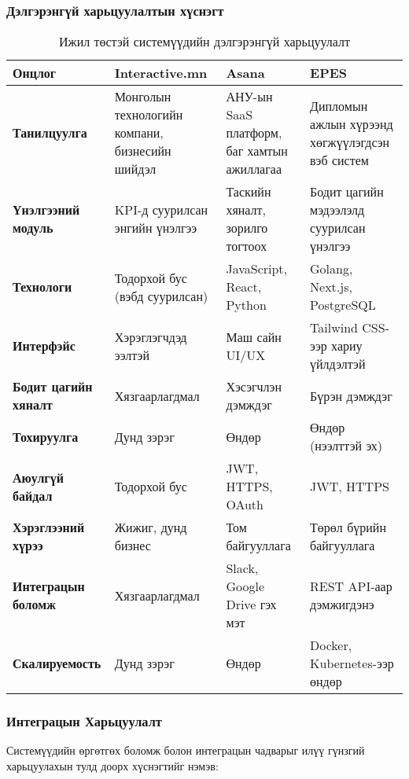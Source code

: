 \subsubsection{Дэлгэрэнгүй харьцуулалтын хүснэгт}
\begin{table}[h]
\centering
\small
\begin{tabular}{|>{\raggedright\arraybackslash}p{3cm}|>{\raggedright\arraybackslash}p{4cm}|>{\raggedright\arraybackslash}p{4cm}|>{\raggedright\arraybackslash}p{4cm}|}
\hline
\textbf{Онцлог} & \textbf{Interactive.mn} & \textbf{Asana} & \textbf{EPES} \\
\hline
\textbf{Танилцуулга} & Монголын технологийн компани, бизнесийн шийдэл & АНУ-ын SaaS платформ, баг хамтын ажиллагаа & Дипломын ажлын хүрээнд хөгжүүлэгдсэн вэб систем \\
\hline
\textbf{Үнэлгээний модуль} & KPI-д суурилсан энгийн үнэлгээ & Таскийн хяналт, зорилго тогтоох & Бодит цагийн мэдээлэлд суурилсан үнэлгээ \\
\hline
\textbf{Технологи} & Тодорхой бус (вэбд суурилсан) & JavaScript, React, Python & Golang, Next.js, PostgreSQL \\
\hline
\textbf{Интерфэйс} & Хэрэглэгчдэд ээлтэй & Маш сайн UI/UX & Tailwind CSS-ээр хариу үйлдэлтэй \\
\hline
\textbf{Бодит цагийн хяналт} & Хязгаарлагдмал & Хэсэгчлэн дэмждэг & Бүрэн дэмждэг \\
\hline
\textbf{Тохируулга} & Дунд зэрэг & Өндөр & Өндөр (нээлттэй эх) \\
\hline
\textbf{Аюулгүй байдал} & Тодорхой бус & JWT, HTTPS, OAuth & JWT, HTTPS \\
\hline
\textbf{Хэрэглээний хүрээ} & Жижиг, дунд бизнес & Том байгууллага & Төрөл бүрийн байгууллага \\
\hline
\textbf{Интеграцын боломж} & Хязгаарлагдмал & Slack, Google Drive гэх мэт & REST API-аар дэмжигдэнэ \\
\hline
\textbf{Скалируемость} & Дунд зэрэг & Өндөр & Docker, Kubernetes-ээр өндөр \\
\hline
\end{tabular}
\caption{Ижил төстэй системүүдийн дэлгэрэнгүй харьцуулалт}
\label{tab:detailed_comparison}
\end{table}


\subsubsection{Интеграцын Харьцуулалт}
Системүүдийн өргөтгөх боломж болон интеграцын чадварыг илүү гүнзгий харьцуулахын тулд доорх хүснэгтийг нэмэв:

